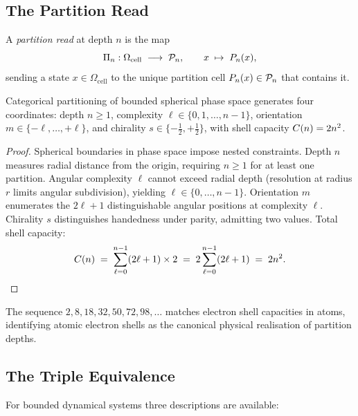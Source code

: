 \subsection{The Partition Read}

\begin{definition}
\label{def:partition-read}
A \emph{partition read} at depth $n$ is the map
\[
    \Pi_n : \Omega_\mathrm{cell} \;\longrightarrow\; \mathcal{P}_n,
    \qquad
    x \;\mapsto\; P_n(x),
\]
sending a state $x\in\Omega_\mathrm{cell}$ to the unique partition cell
$P_n(x)\in\mathcal{P}_n$ that contains it.
\end{definition}

\begin{theorem}
\label{thm:partition-coords}
Categorical partitioning of bounded spherical phase space generates four
coordinates: depth $n \ge 1$, complexity $\ell \in \{0,1,\ldots,n-1\}$,
orientation $m \in \{-\ell,\ldots,+\ell\}$, and chirality
$s \in \{-\tfrac{1}{2},+\tfrac{1}{2}\}$, with shell capacity
$C(n) = 2n^2$.
\end{theorem}

\begin{proof}
Spherical boundaries in phase space impose nested constraints.  Depth $n$
measures radial distance from the origin, requiring $n \ge 1$ for at least
one partition.  Angular complexity $\ell$ cannot exceed radial depth (resolution
at radius $r$ limits angular subdivision), yielding $\ell \in \{0,\ldots,n-1\}$.
Orientation $m$ enumerates the $2\ell+1$ distinguishable angular positions at
complexity $\ell$.  Chirality $s$ distinguishes handedness under parity,
admitting two values.  Total shell capacity:
\[
    C(n) \;=\; \sum_{\ell=0}^{n-1}(2\ell+1)\times 2
    \;=\; 2\sum_{\ell=0}^{n-1}(2\ell+1) \;=\; 2n^2.
\]
\end{proof}

\begin{corollary}
The sequence $2, 8, 18, 32, 50, 72, 98, \ldots$ matches electron shell
capacities in atoms, identifying atomic electron shells as the canonical
physical realisation of partition depths.
\end{corollary}

\subsection{The Triple Equivalence}

For bounded dynamical systems three descriptions are available:

